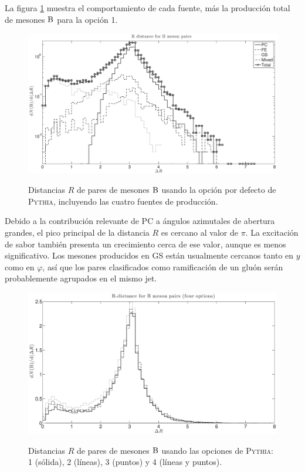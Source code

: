 La figura \ref{fig:BBROp1} muestra el comportamiento de cada fuente, más la producción total de mesones $\B$ para la opción 1.
\begin{figure}[!h]
\centering
\caption[Distancia $R$ de pares de mesones $\B$. Opción por feceto de \textsc{Pythia}.]{ Distancias $R$ de pares de mesones $\B$ usando la opción por defecto de \textsc{Pythia}, incluyendo las cuatro fuentes de producción.}
\includegraphics[width=15cm]{BBROp1}
\label{fig:BBROp1}
\end{figure}
Debido a la contribución relevante de PC a ángulos azimutales de abertura grandes, el pico principal de la distancia $R$ es cercano al valor de $\pi$. La excitación de sabor también presenta un crecimiento cerca de ese valor, aunque es menos significativo. Los mesones producidos en GS están usualmente cercanos tanto en $y$ como en $\varphi$, así que los pares clasificados como ramificación de un gluón serán probablemente agrupados en el mismo jet.
\begin{figure}[!h]
\centering
\caption[Distancia $R$ de pares de mesones $\B$. Cuatro opciones de \textsc{Pythia}.]{Distancias $R$ de pares de mesones $\B$ usando las opciones  de \textsc{Pythia}:  1 (sólida), 2 (líneas), 3 (puntos) y 4 (líneas y puntos).}
\includegraphics[width=15cm]{BBR4Op}
\label{fig:BBR4Op}
\end{figure}

